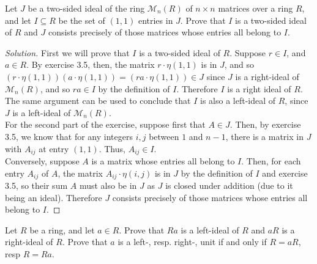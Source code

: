\documentclass[12pt]{article}
\newenvironment{problem}[2][Problem]{\begin{trivlist}
\item[\hskip \labelsep {\bfseries #1}\hskip \labelsep {\bfseries #2.}]}{\end{trivlist}}
\newenvironment{solution}
  {\renewcommand\qedsymbol{$\blacksquare$}\begin{proof}[Solution]}
{\end{proof}}
\theoremstyle{remark}
\begin{document}
\begin{problem}{3.6}
  Let $J$ be a two-sided ideal of the ring $\mathcal{M}_n(R)$ of $n\times n$ matrices over a ring $R$,
  and let $I\subseteq R$ be the set of $(1,1)$ entries in $J$.
  Prove that $I$ is a two-sided ideal of $R$ and $J$ consists precisely of those matrices whose
  entries all belong to $I$.
\end{problem}
\begin{solution}
  First we will prove that $I$ is a two-sided ideal of $R$.
  Suppose $r\in I$, and $a\in R$.
  By exercise 3.5, then, the matrix $r\cdot\eta(1,1)$ is in $J$, and so 
  $(r\cdot\eta(1,1))(a\cdot\eta(1,1))=(ra\cdot\eta(1,1))\in J$ since $J$ is a right-ideal of
  $\mathcal{M}_n(R)$, and so $ra\in I$ by the definition of $I$.
  Therefore $I$ is a right ideal of $R$.
  The same argument can be used to conclude that $I$ is also a left-ideal of $R$,
  since $J$ is a left-ideal of $\mathcal{M}_n(R)$. \\
  \indent For the second part of the exercise, suppose first that $A\in J$.
  Then, by exercise 3.5, we know that for any integers $i,j$ between $1$ and $n-1$,
  there is a matrix in $J$ with $A_{ij}$ at entry $(1,1)$.
  Thus, $A_{ij}\in I$. \\
  \indent Conversely, suppose $A$ is a matrix whose entries all belong to $I$.
  Then, for each entry $A_{ij}$ of $A$, the matrix $A_{ij}\cdot\eta(i,j)$ is in $J$ by
  the definition of $I$ and exercise 3.5, so their sum $A$ must also be in $J$ as $J$
  is closed under addition (due to it being an ideal).
  Therefore $J$ consists precisely of those matrices whose entries all belong to $I$.
\end{solution}

\begin{problem}{3.7}
  Let $R$ be a ring, and let $a\in R$.
  Prove that $Ra$ is a left-ideal of $R$ and $aR$ is a right-ideal of $R$.
  Prove that $a$ is a left-, resp. right-, unit if and only if $R=aR$, resp $R=Ra$.
\end{problem}<++>
\end{document}

